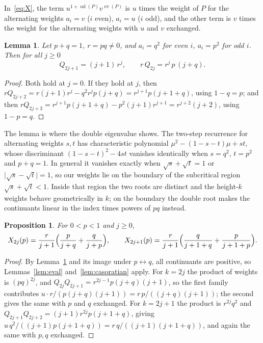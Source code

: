 \documentclass[11pt]{amsart}
\newtheorem{proposition}[theorem]{Proposition}
\newtheorem{lemma}[theorem]{Lemma}
\theoremstyle{definition}
\theoremstyle{remark}
\newcommand{\ev}{\operatorname{ev}}
\newcommand{\od}{\operatorname{od}}
\begin{document}
In~\eqref{eq:X}, the term $u^{1+\od(P)}v^{\ev(P)}$ is $u$ times the weight of $P$ for the alternating
weights $a_i=v$ ($i$ even), $a_i=u$ ($i$ odd), and the other term is $v$ times the weight for the
alternating weights with $u$ and $v$ exchanged.

\begin{lemma}\label{lem:Q}
Let $p+q=1$, $r=pq\ne0$, and $a_i=q^2$ for even $i$, $a_i=p^2$ for odd $i$. Then for all $j\ge0$
\[
Q_{2j+1}=(j+1)\,r^j,\qquad r\,Q_{2j}=r^j\,p\,(j+q).
\]
\end{lemma}

\begin{proof}
Both hold at $j=0$. If they hold at $j$, then $rQ_{2j+2}=r(j+1)r^j-q^2r^jp(j+q)=r^{j+1}p(j+1+q)$, using
$1-q=p$; and then $rQ_{2j+3}=r^{j+1}p(j+1+q)-p^2(j+1)r^{j+1}=r^{j+2}(j+2)$, using $1-p=q$.
\end{proof}

The lemma is where the double eigenvalue shows. The two-step recurrence for alternating weights $s,t$
has characteristic polynomial $\mu^2-(1-s-t)\mu+st$, whose discriminant $(1-s-t)^2-4st$ vanishes
identically when $s=q^2$, $t=p^2$ and $p+q=1$. In general it vanishes exactly when
$\sqrt s+\sqrt t=1$ or $\lvert\sqrt s-\sqrt t\rvert=1$, so our weights lie on the boundary of the
subcritical region $\sqrt s+\sqrt t<1$. Inside that region the two roots are distinct and the
height-$k$ weights behave geometrically in $k$; on the boundary the double root makes the
continuants linear in the index times powers of $pq$ instead.

\begin{proposition}\label{prop:X}
For $0<p<1$ and $j\ge0$,
\[
X_{2j}(p)=\frac{r}{j+1}\Bigl(\frac{p}{j+q}+\frac{q}{j+p}\Bigr),\qquad
X_{2j+1}(p)=\frac{r}{j+1}\Bigl(\frac{q}{j+1+q}+\frac{p}{j+1+p}\Bigr).
\]
\end{proposition}

\begin{proof}
By Lemma~\ref{lem:Q} and its image under $p\leftrightarrow q$, all continuants are positive, so
Lemmas~\ref{lem:eval} and~\ref{lem:casoratian} apply. For $k=2j$ the product of weights is $(pq)^{2j}$,
and $Q_{2j}Q_{2j+1}=r^{2j-1}p(j+q)(j+1)$, so the first family contributes
$u\cdot r/(p(j+q)(j+1))=r\,p/((j+q)(j+1))$; the second gives the same with $p$ and $q$ exchanged.
For $k=2j+1$ the product is $r^{2j}q^2$ and $Q_{2j+1}Q_{2j+2}=(j+1)r^{2j}p(j+1+q)$, giving
$u\,q^2/((j+1)p(j+1+q))=r\,q/((j+1)(j+1+q))$, and again the same with $p,q$ exchanged.
\end{proof}
\end{document}
